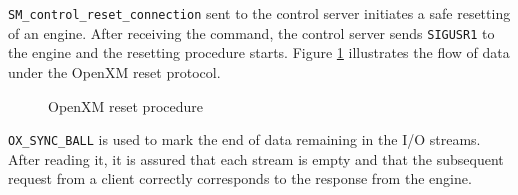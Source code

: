 {\tt SM\_control\_reset\_connection} sent to the control server
initiates a safe resetting of an engine.
After receiving the command, the control server sends {\tt SIGUSR1} 
to the engine and the resetting procedure starts.
Figure \ref{reset} illustrates the flow of data under the OpenXM
reset protocol.
\begin{figure}[htbp]
\begin{center}
\epsfxsize=8cm
\caption{OpenXM reset procedure}
\label{reset}
\end{center}
\end{figure}
{\tt OX\_SYNC\_BALL} is used to mark the end of data remaining in the
I/O streams. After reading it, it is assured that each stream is empty
and that the subsequent request from a client correctly 
corresponds to the response from the engine.

